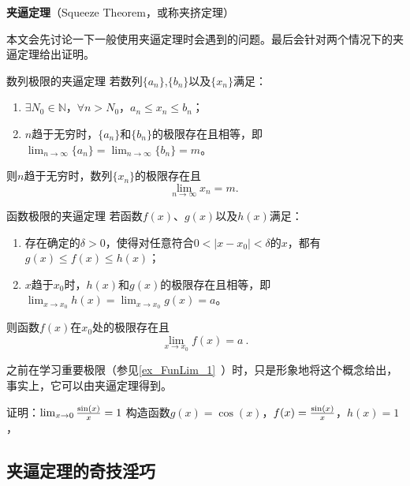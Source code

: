 
\begin{issues}
\issueDraft
\end{issues}
\textbf{夹逼定理}（Squeeze Theorem，或称夹挤定理）

本文会先讨论一下一般使用夹逼定理时会遇到的问题。最后会针对两个情况下的夹逼定理给出证明。



\begin{theorem}{数列极限的夹逼定理}
若数列$\{a_n\}$,$\{b_n\}$以及$\{x_n\}$满足：
\begin{enumerate}
\item $\exists N_0\in \mathbb{N}$，$\forall n>N_0$，$a_n\leq x_n\leq b_n$；
\item $n$趋于无穷时，$\{a_n\}$和$\{b_n\}$的极限存在且相等，即$\lim_{n\to\infty}\{a_n\}=\lim_{n\to\infty}\{b_n\}=m$。
\end{enumerate}
则$n$趋于无穷时，数列$\{x_n\}$的极限存在且
\begin{equation}
\lim_{n\to\infty}x_n =m.~
\end{equation}
\end{theorem}

\begin{theorem}{函数极限的夹逼定理}
若函数$f(x)$、$g(x)$以及$h(x)$满足：
\begin{enumerate}
\item 存在确定的$\delta>0$，使得对任意符合$0<|x-x_0|<\delta$的$x$，都有$g(x)\leq f(x)\leq h(x)$；
\item $x$趋于$x_0$时，$h(x)$和$g(x)$的极限存在且相等，即$\lim _{x\to x_0}h(x)=\lim _{x\to x_0}g(x)=a$。
\end{enumerate}
则函数$f(x)$在$x_0$处的极限存在且
\begin{equation}
\lim _{x\to x_0}f(x)=a~.
\end{equation}
\end{theorem}



之前在学习重要极限（参见\autoref{ex_FunLim_1}~）时，只是形象地将这个概念给出，事实上，它可以由夹逼定理得到。
\begin{example}{证明：$\lim_{x\to0}{\sin(x)\over x}=1$}
构造函数$g(x)=\cos(x)$，$f(x)={\sin(x)\over x}$，$h(x)=1$，
\end{example}


\subsection{夹逼定理的奇技淫巧}

